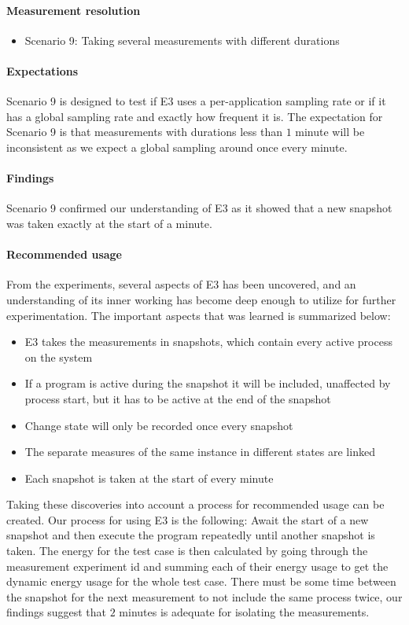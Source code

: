\paragraph{Measurement resolution}

\begin{itemize}
    \item Scenario 9: Taking several measurements with different durations
\end{itemize}

\paragraph{Expectations}
Scenario 9 is designed to test if E3 uses a per-application sampling rate or if it has a global sampling rate and exactly how frequent it is. The expectation for Scenario 9 is that measurements with durations less than $1$ minute will be inconsistent as we expect a global sampling around once every minute.

\paragraph{Findings}
Scenario 9 confirmed our understanding of E3 as it showed that a new snapshot was taken exactly at the start of a minute.

\paragraph {Recommended usage}
From the experiments, several aspects of E3 has been uncovered, and an understanding of its inner working has become deep enough to utilize for further experimentation. The important aspects that was learned is summarized below:


\begin{itemize}
    \item E3 takes the measurements in snapshots, which contain every active process on the system
    \item If a program is active during the snapshot it will be included, unaffected by process start, but it has to be active at the end of the snapshot
    \item Change state will only be recorded once every snapshot
    \item The separate measures of the same instance in different states are linked
    \item Each snapshot is taken at the start of every minute
\end{itemize} 

Taking these discoveries into account a process for recommended usage can be created. Our process for using E3 is the following: Await the start of a new snapshot and then execute the program repeatedly until another snapshot is taken. The energy for the test case is then calculated by going through the measurement experiment id and summing each of their energy usage to get the dynamic energy usage for the whole test case. There must be some time between the snapshot for the next measurement to not include the same process twice, our findings suggest that $2$ minutes is adequate for isolating the measurements.    